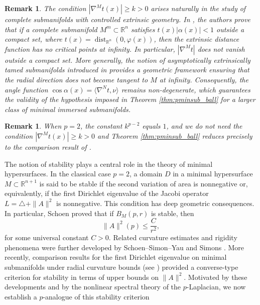 \documentclass{article}
\newtheorem{remark}[thm]{Remark}
\begin{document}
\begin{remark}
The condition $|\nabla^{M}t(x)| \ge k >0$ arises naturally in the study of complete submanifolds with controlled extrinsic geometry. In \cite{BessaBarbosaMontenegro2007}, the authors prove that if a complete 
submanifold $M^m \subset \mathbb{R}^n$ satisfies $t(x)|\alpha(x)| < 1$ outside a compact set, where $t(x)=\operatorname{dist}_{\mathbb{R}^n}(0,\varphi(x))$, then the extrinsic distance function has no critical points at infinity. In particular, $|\nabla^M t|$ does not vanish outside a compact set. More generally, the notion of asymptotically extrinsically tamed submanifolds introduced in \cite[Theorem 1.1]{BessaGimenoPalmer2017} provides a geometric framework ensuring that the radial direction does not become tangent to $M$ at infinity. Consequently, the angle function $\cos{\alpha(x)}=\langle \nabla^N t, \nu\rangle$ remains non-degenerate, which guarantees the validity of the hypothesis imposed in Theorem \ref{thm:pminsub_ball} for a larger class of minimal immersed submanifolds.
\end{remark}

\begin{remark}
When $p=2$, the constant $k^{p-2}$ equals $1$, and we do not need  the condition $|\nabla^{M}t(x)| \ge k >0$ and Theorem \eqref{thm:pminsub_ball} reduces precisely to the comparison result of \cite[Theorem 1.10]{BessaMontenegro}.
\end{remark}

The notion of stability plays a central role in the theory of minimal hypersurfaces.
In the classical case $p=2$, a domain $D$ in a minimal hypersurface $M \subset \mathbb{R}^{n+1}$ is said to be stable if the second variation of area 
is nonnegative or, equivalently, if the first Dirichlet eigenvalue of the 
Jacobi operator $L=\triangle + \|A\|^2$ is nonnegative. 
This condition has deep geometric consequences. In particular, Schoen \cite{SchoenYau1994} proved that if 
$B_M(p,r)$ is stable, then
\[
\|A\|^2(p) \le \frac{C}{r^2},
\]
for some universal constant $C>0$. Related curvature estimates and rigidity phenomena were further developed by Schoen--Simon--Yau \cite{SchoenSimonYau1975} and Simons \cite{Simons}. More recently, comparison results for the first Dirichlet eigenvalue on minimal submanifolds under radial curvature bounds (see \cite[Corollary 1.12]{BessaMontenegro2003}) provided a converse-type criterion for stability in terms of upper bounds on $\|A\|^2$. Motivated by these developments and by the nonlinear spectral theory of the $p$-Laplacian, we now establish a $p$-analogue of this stability criterion 
\end{document}
